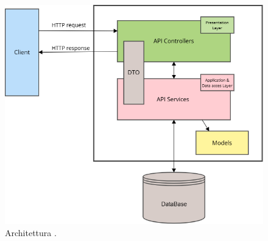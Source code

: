 \begin{figure}[H]
    \centering
    \includegraphics[width=\textwidth]{thesis/files/img/Untitled.png}
    \caption{Architettura \protect{}.}
    \label{fig:iarchitettura}
\end{figure}


